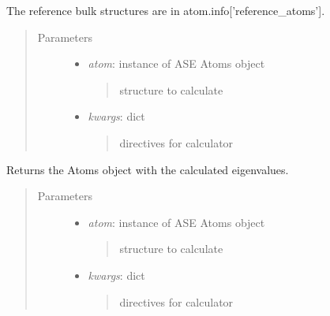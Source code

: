 \documentclass[letterpaper,10pt,english]{sphinxmanual}
\begin{document}
\begin{fulllineitems}
\begin{fulllineitems}
The reference bulk structures are in atom.info{[}'reference\_atoms'{]}.
\begin{quote}\begin{description}
\item[{Parameters}] \leavevmode\begin{itemize}
\item {} 
\emph{atom}: instance of ASE Atoms object
\begin{quote}

structure to calculate
\end{quote}

\item {} 
\emph{kwargs}: dict
\begin{quote}

directives for calculator
\end{quote}

\end{itemize}

\end{description}\end{quote}

\end{fulllineitems}


\begin{fulllineitems}
\label{classes:catcalc.CATCalc.calc_ebs}
Returns the Atoms object with the calculated eigenvalues.
\begin{quote}\begin{description}
\item[{Parameters}] \leavevmode\begin{itemize}
\item {} 
\emph{atom}: instance of ASE Atoms object
\begin{quote}

structure to calculate
\end{quote}

\item {} 
\emph{kwargs}: dict
\begin{quote}

directives for calculator
\end{quote}

\end{itemize}

\end{description}\end{quote}


\end{fulllineitems}
\end{fulllineitems}
\end{document}
